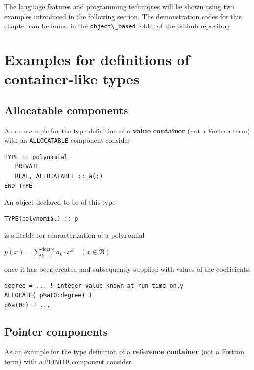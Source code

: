 \documentclass[
  paper=a4,
  ,captions=tableheading
]{scrartcl}
\newcommand{\passthrough}[1]{#1}
\begin{document}
The language features and programming techniques will be shown using two
examples introduced in the following section. The demonstration codes
for this chapter can be found in the
\passthrough{\lstinline!object\_based!} folder of the
\href{https://github.com/reinh-bader/object_fortran}{Github repository}.

\section{Examples for definitions of container-like
types}\label{examples-for-definitions-of-container-like-types}

\subsection{Allocatable components}\label{allocatable-components}

As an example for the type definition of a \textbf{value container} (not
a Fortran term) with an \passthrough{\lstinline!ALLOCATABLE!} component
consider

\begin{lstlisting}
TYPE :: polynomial
   PRIVATE
   REAL, ALLOCATABLE :: a(:)
END TYPE
\end{lstlisting}

An object declared to be of this type

\begin{lstlisting}
TYPE(polynomial) :: p
\end{lstlisting}

is suitable for characterization of a polynomial

\(p(x) = \sum_{k=0}^{\text{degree}} a_{k} \cdot x^k \quad (x \in \Re)\)

once it has been created and subsequently supplied with values of the
coefficients:

\begin{lstlisting}
degree = ... ! integer value known at run time only
ALLOCATE( p%a(0:degree) )
p%a(0:) = ...
\end{lstlisting}

\subsection{Pointer components}\label{pointer-components}

As an example for the type definition of a \textbf{reference container}
(not a Fortran term) with a \passthrough{\lstinline!POINTER!} component
consider
\end{document}
